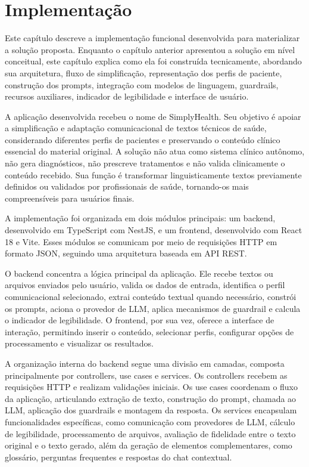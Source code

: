 \chapter{Implementação}
\label{cap:implementacao}

Este capítulo descreve a implementação funcional desenvolvida para materializar a solução proposta. Enquanto o capítulo anterior apresentou a solução em nível conceitual, este capítulo explica como ela foi construída tecnicamente, abordando sua arquitetura, fluxo de simplificação, representação dos perfis de paciente, construção dos prompts, integração com modelos de linguagem, guardrails, recursos auxiliares, indicador de legibilidade e interface de usuário.

A aplicação desenvolvida recebeu o nome de SimplyHealth. Seu objetivo é apoiar a simplificação e adaptação comunicacional de textos técnicos de saúde, considerando diferentes perfis de pacientes e preservando o conteúdo clínico essencial do material original. A solução não atua como sistema clínico autônomo, não gera diagnósticos, não prescreve tratamentos e não valida clinicamente o conteúdo recebido. Sua função é transformar linguisticamente textos previamente definidos ou validados por profissionais de saúde, tornando-os mais compreensíveis para usuários finais.

A implementação foi organizada em dois módulos principais: um backend, desenvolvido em TypeScript com NestJS, e um frontend, desenvolvido com React 18 e Vite. Esses módulos se comunicam por meio de requisições HTTP em formato JSON, seguindo uma arquitetura baseada em API REST.

O backend concentra a lógica principal da aplicação. Ele recebe textos ou arquivos enviados pelo usuário, valida os dados de entrada, identifica o perfil comunicacional selecionado, extrai conteúdo textual quando necessário, constrói os prompts, aciona o provedor de LLM, aplica mecanismos de guardrail e calcula o indicador de legibilidade. O frontend, por sua vez, oferece a interface de interação, permitindo inserir o conteúdo, selecionar perfis, configurar opções de processamento e visualizar os resultados.

A organização interna do backend segue uma divisão em camadas, composta principalmente por controllers, use cases e services. Os controllers recebem as requisições HTTP e realizam validações iniciais. Os use cases coordenam o fluxo da aplicação, articulando extração de texto, construção do prompt, chamada ao LLM, aplicação dos guardrails e montagem da resposta. Os services encapsulam funcionalidades específicas, como comunicação com provedores de LLM, cálculo de legibilidade, processamento de arquivos, avaliação de fidelidade entre o texto original e o texto gerado, além da geração de elementos complementares, como glossário, perguntas frequentes e respostas do chat contextual.

